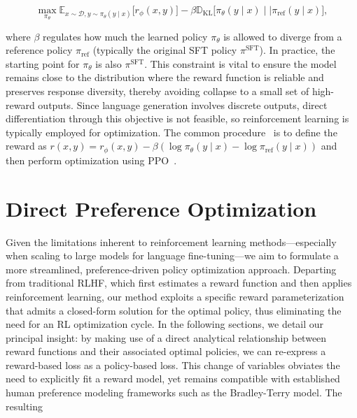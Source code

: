 \begin{equation}\label{eq:RL}
\max_{\pi_{\theta}}  \mathbb{E}_{x\sim \mathcal{D}, y\sim \pi_{\theta}(y \mid x)}\bigl[r_{\phi}(x, y)\bigr] - \beta\mathbb{D}_{\textrm{KL}}\bigl[\pi_{\theta}(y\mid x)\mid \mid \pi_\text{ref}(y\mid x)\bigr],
\end{equation}

where $\beta$ regulates how much the learned policy $\pi_\theta$ is allowed to diverge from a reference policy $\pi_\text{ref}$ (typically the original SFT policy $\pi^\text{SFT}$). In practice, the starting point for $\pi_\theta$ is also $\pi^\text{SFT}$. This constraint is vital to ensure the model remains close to the distribution where the reward function is reliable and preserves response diversity, thereby avoiding collapse to a small set of high-reward outputs. Since language generation involves discrete outputs, direct differentiation through this objective is not feasible, so reinforcement learning is typically employed for optimization. The common procedure~\citep{ziegler2020finetuning, stiennon2022learning, bai2022training, ouyang2022training} is to define the reward as ${r(x, y) = r_{\phi}(x, y) -\beta (\log \pi_{\theta}(y\mid x) - \log \pi_\text{ref}(y\mid x))}$ and then perform optimization using PPO~\cite{schulman2017proximal}.

\section{Direct Preference Optimization}\label{sec:DPO}

Given the limitations inherent to reinforcement learning methods—especially when scaling to large models for language fine-tuning—we aim to formulate a more streamlined, preference-driven policy optimization approach. Departing from traditional RLHF, which first estimates a reward function and then applies reinforcement learning, our method exploits a specific reward parameterization that admits a closed-form solution for the optimal policy, thus eliminating the need for an RL optimization cycle. In the following sections, we detail our principal insight: by making use of a direct analytical relationship between reward functions and their associated optimal policies, we can re-express a reward-based loss as a policy-based loss. This change of variables obviates the need to explicitly fit a reward model, yet remains compatible with established human preference modeling frameworks such as the Bradley-Terry model. The resulting

